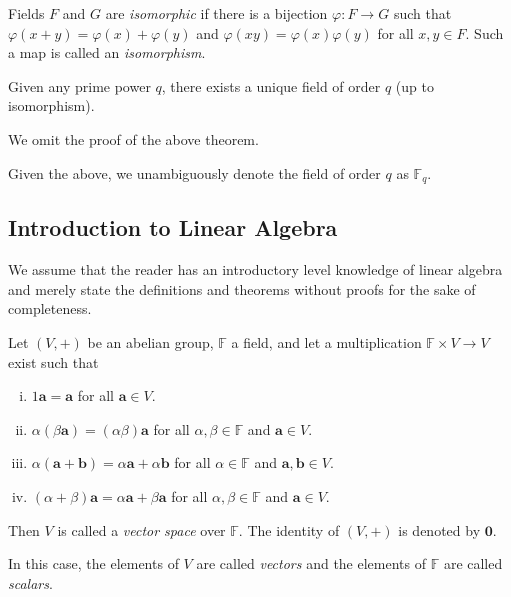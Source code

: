 \begin{definition}
    Fields $F$ and $G$ are \textit{isomorphic} if there is a bijection $\varphi:F\to G$ such that $\varphi(x+y)=\varphi(x)+\varphi(y)$ and $\varphi(xy)=\varphi(x)\varphi(y)$ for all $x,y\in F$. Such a map is called an \textit{isomorphism}.
\end{definition}

\begin{theorem}
    Given any prime power $q$, there exists a unique field of order $q$ (up to isomorphism).
\end{theorem}

We omit the proof of the above theorem.

\vspace{2mm}
Given the above, we unambiguously denote the field of order $q$ as $\mathbb{F}_q$.

\subsection{Introduction to Linear Algebra}
We assume that the reader has an introductory level knowledge of linear algebra and merely state the definitions and theorems without proofs for the sake of completeness.

\begin{definition}
    Let $(V,+)$ be an abelian group, $\mathbb{F}$ a field, and let a multiplication $\mathbb{F}\times V\to V$ exist such that
    \begin{enumerate}[(i)]
        \item $1\textbf{a}=\textbf{a}$ for all $\textbf{a}\in V$.
        \item $\alpha(\beta \textbf{a})=(\alpha\beta)\textbf{a}$ for all $\alpha,\beta\in\mathbb{F}$ and $\textbf{a}\in V$.
        \item $\alpha(\textbf{a}+\textbf{b})=\alpha \textbf{a}+\alpha \textbf{b}$ for all $\alpha\in\mathbb{F}$ and $\textbf{a},\textbf{b}\in V$.
        \item $(\alpha+\beta)\textbf{a}=\alpha \textbf{a}+\beta \textbf{a}$ for all $\alpha,\beta\in\mathbb{F}$ and $\textbf{a}\in V$.
    \end{enumerate}
    
    Then $V$ is called a \textit{vector space} over $\mathbb{F}$. The identity of $(V,+)$ is denoted by $\textbf{0}$.
\end{definition}

In this case, the elements of $V$ are called \textit{vectors} and the elements of $\mathbb{F}$ are called \textit{scalars}.

